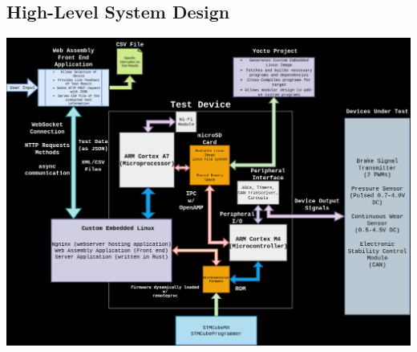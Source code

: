 \documentclass[12pt]{article}
\begin{document}
\subsection{High-Level System Design}

\includegraphics[width=\textwidth]{../assets/block_diagram.png}
\end{document}
